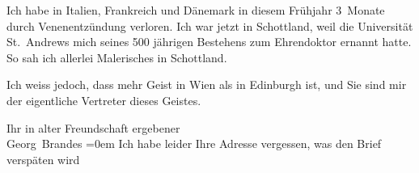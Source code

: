 \pstart
           Ich habe in Italien, Frankreich und Dänemark in
               diesem Frühjahr 3 Monate durch Venenentzündung verloren. Ich war jetzt in {\pb}Schottland, weil die Universität St. Andrews mich \label{K_L02033-4v}\label{K_L02033-4} seines 500 jährigen Bestehens zum Ehrendoktor
               ernannt hatte. So sah ich allerlei Malerisches in Schottland.\pend
           
\pstart
           Ich weiss jedoch, dass mehr Geist in Wien als in
                  Edinburgh ist, und Sie sind mir der
               eigentliche Vertreter dieses Geistes.\pend
           
\pstart
           Ihr in alter Freundschaft ergebener{\\[\baselineskip]}\spacefill\mbox{Georg Brandes}\pend
           \leftskip=0em{}
\pstart
           \noindent{}Ich habe leider Ihre Adresse vergessen, was den Brief verspäten wird\pend
           \endnumbering{}  \newcommand{\dateiname}{L02033}\newcommand{\titel}{Georg Brandes an Arthur Schnitzler, 6. 10. 1911}\newcommand{\editorInnen}{Martin Anton Müller und Gerd-Hermann Susen}
